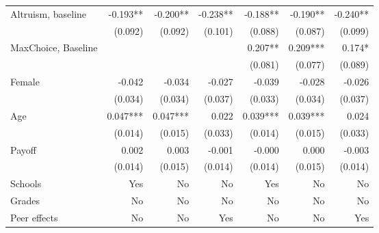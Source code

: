 \begin{table}[htbp]
\begin{adjustbox}{width=1\textwidth}
\begin{threeparttable}
\begin{tabular}{l*{6}{D{.}{.}{-1}}}
Altruism, baseline  &              -0.193** &              -0.200** &              -0.238** &              -0.188** &              -0.190** &              -0.240** \\
                    &             (0.092)   &             (0.092)   &             (0.101)   &             (0.088)   &             (0.087)   &             (0.099)   \\
MaxChoice, Baseline &                       &                       &                       &               0.207** &               0.209***&               0.174*  \\
                    &                       &                       &                       &             (0.081)   &             (0.077)   &             (0.089)   \\
Female              &              -0.042   &              -0.034   &              -0.027   &              -0.039   &              -0.028   &              -0.026   \\
                    &             (0.034)   &             (0.034)   &             (0.037)   &             (0.033)   &             (0.034)   &             (0.037)   \\
Age                 &               0.047***&               0.047***&               0.022   &               0.039***&               0.039***&               0.024   \\
                    &             (0.014)   &             (0.015)   &             (0.033)   &             (0.014)   &             (0.015)   &             (0.033)   \\
Payoff              &               0.002   &               0.003   &              -0.001   &              -0.000   &               0.000   &              -0.003   \\
                    &             (0.014)   &             (0.015)   &             (0.014)   &             (0.014)   &             (0.015)   &             (0.014)   \\
Schools             &                 Yes   &                  No   &                  No   &                 Yes   &                  No   &                  No   \\
Grades              &                  No   &                  No   &                  No   &                  No   &                  No   &                  No   \\
Peer effects        &                  No   &                  No   &                 Yes   &                  No   &                  No   &                 Yes   \\

\end{tabular}
\end{threeparttable}
\end{adjustbox}
\end{table}
